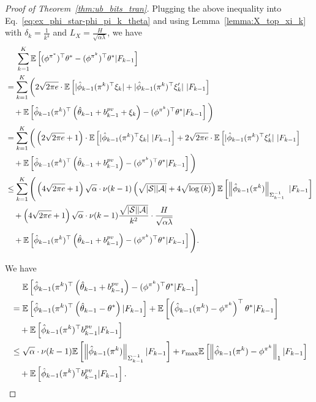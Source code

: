 \begin{proof}[Proof of Theorem~\ref{thm:ub_bits_tran}]
	Plugging the above inequality into Eq.~\eqref{eq:ex_phi_star-phi_pi_k_theta} and using Lemma~\ref{lemma:X_top_xi_k} with $\delta_k=\frac{1}{k^4}$ and $L_{X}=\frac{H}{\sqrt{\alpha \lambda}}$, we have
	\begin{align}
		&\quad\  \sum_{k=1}^{K} \mathbb{E}\left[  (\phi^{\pi^*})^\top \theta^* - (\phi^{\pi^k})^\top \theta^* | F_{k-1}  \right] 
		\nonumber\\
		&= \sum_{k=1}^{K} \bigg( 2\sqrt{2\pi e} \cdot \mathbb{E}\left[  | \hat{\phi}_{k-1}(\pi^k)^\top \xi_k | + | \hat{\phi}_{k-1}(\pi^k)^\top \xi'_k| \ | F_{k-1}  \right] 
		\nonumber\\
		&\quad + \mathbb{E}\left[  \hat{\phi}_{k-1}(\pi^k)^\top \left( \hat{\theta}_{k-1} + b^{pv}_{k-1} + \xi_k \right) - (\phi^{\pi^k})^\top \theta^* | F_{k-1}  \right] \bigg)
		\nonumber\\
		&= \sum_{k=1}^{K} \bigg( \left( 2\sqrt{2\pi e} + 1 \right) \cdot \mathbb{E}\left[  | \hat{\phi}_{k-1}(\pi^k)^\top \xi_k | \ | F_{k-1} \right] + 2\sqrt{2\pi e} \cdot \mathbb{E}\left[  | \hat{\phi}_{k-1}(\pi^k)^\top \xi'_k| \ | F_{k-1}  \right] 
		\nonumber\\
		&\quad + \mathbb{E}\left[  \hat{\phi}_{k-1}(\pi^k)^\top \left( \hat{\theta}_{k-1} + b^{pv}_{k-1} \right) - (\phi^{\pi^k})^\top \theta^* | F_{k-1}  \right] \bigg)
		\nonumber\\
		&\leq \sum_{k=1}^{K} \Bigg( \left( 4\sqrt{2\pi e} + 1 \right) \sqrt{\alpha} \cdot \nu(k-1) \left(  \sqrt{|\mathcal{S}||\mathcal{A}|} + 4 \sqrt{\log\left( k \right)}  \right)  \mathbb{E}\left[  \left\|  \hat{\phi}_{k-1}(\pi^k)  \right\|_{\Sigma_{k-1}^{-1}} \ | F_{k-1} \right] 
		\nonumber\\
		&\quad + \left( 4\sqrt{2\pi e} + 1 \right) \sqrt{\alpha} \cdot \nu(k-1)  \frac{\sqrt{|\mathcal{S}| |\mathcal{A}|}}{k^2}  \cdot \frac{H}{\sqrt{\alpha \lambda}}
		\nonumber\\
		&\quad + \mathbb{E}\left[  \hat{\phi}_{k-1}(\pi^k)^\top \left( \hat{\theta}_{k-1} + b^{pv}_{k-1} \right) - (\phi^{\pi^k})^\top \theta^* | F_{k-1}  \right] \Bigg) . \label{eq:known_tran_ex_phi_star_theta_star-phi_k_theta_star}
	\end{align}
	
	We have
	\begin{align*}
		&\quad\  \mathbb{E}\left[  \hat{\phi}_{k-1}(\pi^k)^\top \left( \hat{\theta}_{k-1} + b^{pv}_{k-1} \right) - (\phi^{\pi^k})^\top \theta^* | F_{k-1}  \right]
		\nonumber\\
		&= \mathbb{E}\left[  \hat{\phi}_{k-1}(\pi^k)^\top \left( \hat{\theta}_{k-1} - \theta^* \right) | F_{k-1}  \right] + \mathbb{E}\left[  \left(  \hat{\phi}_{k-1}(\pi^k) - \phi^{\pi^k}  \right)^\top \theta^* | F_{k-1}  \right] 
		\nonumber\\
		&\quad + \mathbb{E}\left[  \hat{\phi}_{k-1}(\pi^k)^\top b^{pv}_{k-1} | F_{k-1}  \right]
		\nonumber\\
		&\leq \sqrt{\alpha} \cdot \nu(k-1) \mathbb{E}\left[  \left\|  \hat{\phi}_{k-1}(\pi^k)  \right\|_{\Sigma_{k-1}^{-1}} | F_{k-1}  \right] + r_{\max} \mathbb{E}\left[  \left\|  \hat{\phi}_{k-1}(\pi^k) - \phi^{\pi^k}  \right\|_1 | F_{k-1}  \right]  
		\nonumber\\
		&\quad + \mathbb{E}\left[  \hat{\phi}_{k-1}(\pi^k)^\top b^{pv}_{k-1} | F_{k-1}  \right] . \label{eq:known_tran_error_phi_theta_tran}
	\end{align*}
	

\end{proof}
